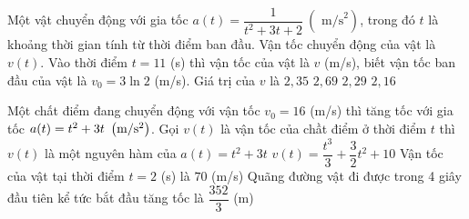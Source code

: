 \begin{ex}%
	Một vật chuyển động với gia tốc $a\left( t \right)=\dfrac{1}{t^2+3t+2}~\left( \text{ m/s}^2 \right)$, trong đó $t$ là khoảng thời gian tính từ thời điểm ban đầu. Vận tốc chuyển động của vật là $v\left( t \right)$. Vào thời  điểm $t=11$ (s) thì vận tốc của vật là $v$ (m/s), biết vận tốc ban đầu của vật là $v_0=3\ln 2$ (m/s). Giá trị của $v$ là
	 \choice
		{$2{,}35$} 
		 {\True $2{,}69$}
		 {$2{,}29$}
		 {$2{,}16$}
\end{ex}

\begin{ex}%

	Một chất điểm đang chuyển động với vận tốc $v_0=16$ (m/s) thì tăng tốc với gia tốc $a(t)=t^2+3t\,\,\left(\rm{m} / \rm{s}^2\right)$.
	\choiceTF
	{\True Gọi $v(t)$ là vận tốc của chầt điểm ở thời điểm $t$ thì $v(t)$ là một 	nguyên hàm của $a(t)=t^2+3t$}
	{$v(t)=\dfrac{t^3}{3}+\dfrac{3}{2} t^2+10$}
	{Vận tốc của vật tại thời điểm $t=2$ (s) là $70$ (m/s)}
	{\True Quãng đường vật đi được trong 4 giây đầu tiên kể tức bắt đầu tăng tốc là $\dfrac{352}{3}$ (m) }
\end{ex}

